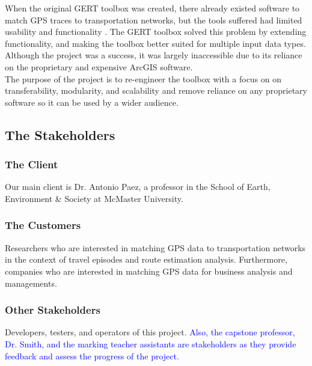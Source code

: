 \documentclass[12pt, titlepage]{article}
\begin{document}
\noindent When the original GERT toolbox was created, there already existed software to match GPS traces to transportation networks, but the tools suffered had limited usability and functionality \cite{GISBASED}. The GERT toolbox solved this problem by extending functionality, and making the toolbox better suited for multiple input data types. Although the project was a success, it was largely inaccessible due to its reliance on the proprietary and expensive ArcGIS software. \\

\noindent The purpose of the project is to re-engineer the toolbox with a focus on on transferability, modularity, and scalability and remove reliance on any proprietary software so it can be used by a wider audience. 

\subsection{The Stakeholders}
\subsubsection{The Client}
Our main client is Dr. Antonio Paez, a professor in the School of Earth, Environment & Society at McMaster University. 

\subsubsection{The Customers}
Researchers who are interested in matching GPS data to transportation networks in the context of travel episodes and route estimation analysis. Furthermore, companies who are interested in matching GPS data for business analysis and managements. 

\subsubsection{Other Stakeholders}
Developers, testers, and operators of this project. \textcolor{blue}{Also, the capstone professor, Dr. Smith, and the marking teacher assistants are stakeholders as they provide feedback and assess the progress of the project. }
\end{document}

